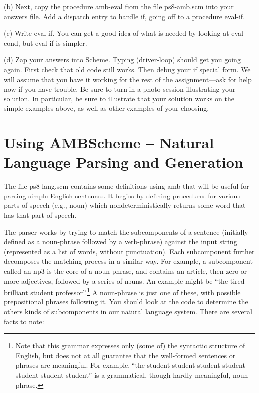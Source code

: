 (b)
Next, copy the procedure {\cf amb-eval} from the file {\cf
ps8-amb.scm} into your answers file.  Add a dispatch entry to
handle {\cf if}, going off to a procedure {\cf eval-if}.

(c)
Write {\cf eval-if}.  You can get a good idea of what is needed by
looking at {\cf eval-cond}, but {\cf eval-if} is simpler.

(d)
Zap your answers into {\sc Scheme}.  Typing {\cf (driver-loop)}
should get
you going again.  First check that old code still works.  Then debug
your {\cf if} special form.  We will assume that you have it working
for the rest of the assignment---ask for help now if you have
trouble.  Be sure to turn in a photo session illustrating your
solution.  In particular, be sure to illustrate that your solution works
on the simple examples above, as well as other examples of your choosing.

\section{Using {\sc AMBScheme} -- Natural Language Parsing and Generation}

The file {\cf ps8-lang.scm} contains some definitions using {\cf
amb} that will be useful for parsing simple English sentences.  It begins by
defining procedures for various parts of speech (e.g., {\cf noun}) which
nondeterministically returns some word that has that part of speech.

The parser works by trying to match the subcomponents of a sentence
(initially defined as a noun-phrase followed by a verb-phrase)
against the input string (represented as a list of words, without
punctuation).  Each subcomponent further decomposes the matching
process in a similar way. For example, a subcomponent called an {\cf
np3} is the core of a noun phrase, and contains an article, then zero
or more adjectives, followed by a series of nouns.  An example might
be ``the tired brilliant student professor''.\footnote{Note that this
grammar expresses only (some of) the syntactic structure of English,
but does not at all guarantee that the well-formed sentences or
phrases are meaningful.  For example, ``the student student student
student student student student'' is a grammatical, though hardly
meaningful, noun phrase.} A {\cf noun-phrase} is just one of these,
with possible prepositional phrases following it.  You should look at
the code to determine the others kinds of subcomponents in our
natural language system.  There are several facts to note:

